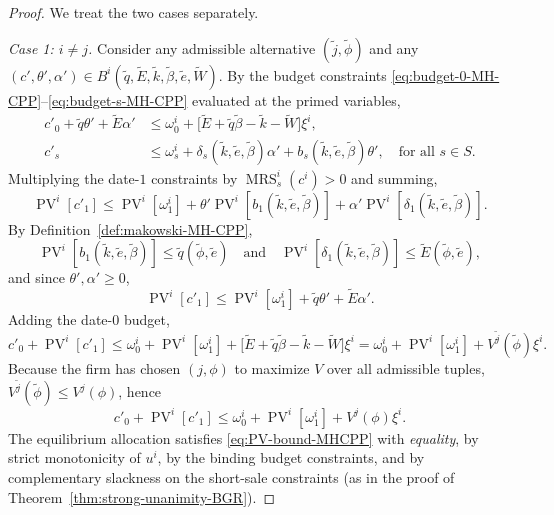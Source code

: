 \documentclass[11pt,a4paper,oneside]{book}
\def\leq{\leqslant}
\def\geq{\geqslant}
\def\et{\quad \text{and} \quad}
\DeclareMathOperator{\MRS}{MRS}
\DeclareMathOperator{\PV}{PV}
\theoremstyle{plain}
\theoremstyle{definition}
\theoremstyle{remark}
\numberwithin{equation}{chapter}
\begin{document}
\begin{proof}
We treat the two cases separately.

\emph{Case 1: $i \neq j$.}
Consider any admissible alternative $(\widetilde{j}, \widetilde{\phi})$ and any $(c', \theta', \alpha') \in B^i(\widetilde{q}, \widetilde{E}, \widetilde{k}, \widetilde{\beta}, \widetilde{e}, \widetilde{W})$.
By the budget constraints \eqref{eq:budget-0-MH-CPP}--\eqref{eq:budget-s-MH-CPP} evaluated at the primed variables,
\begin{align*}
  c'_0 + \widetilde{q} \theta' + \widetilde{E} \alpha'
  &\leq \omega^i_0 + \bigl[ \widetilde{E} + \widetilde{q} \widetilde{\beta} - \widetilde{k} - \widetilde{W} \bigr] \xi^i, \\
  c'_s
  &\leq \omega^i_s + \delta_s(\widetilde{k}, \widetilde{e}, \widetilde{\beta}) \alpha' + b_s(\widetilde{k}, \widetilde{e}, \widetilde{\beta}) \theta', \quad \text{for all $s\in S$}.
\end{align*}
Multiplying the date-$1$ constraints by $\MRS^i_s(c^i) > 0$ and summing,
\begin{equation*}
  \PV^i[c'_1]
  \leq \PV^i[\omega^i_1] + \theta' \PV^i[b_1(\widetilde{k}, \widetilde{e}, \widetilde{\beta})] + \alpha' \PV^i[\delta_1(\widetilde{k}, \widetilde{e}, \widetilde{\beta})].
\end{equation*}
By Definition~\ref{def:makowski-MH-CPP},
\begin{equation*}
  \PV^i[b_1(\widetilde{k}, \widetilde{e}, \widetilde{\beta})] \leq \widetilde{q}(\widetilde{\phi}, \widetilde{e})
  \et
  \PV^i[\delta_1(\widetilde{k}, \widetilde{e}, \widetilde{\beta})] \leq \widetilde{E}(\widetilde{\phi}, \widetilde{e}),
\end{equation*}
and since $\theta', \alpha' \geq 0$,
\begin{equation*}
  \PV^i[c'_1] \leq \PV^i[\omega^i_1] + \widetilde{q} \theta' + \widetilde{E} \alpha'.
\end{equation*}
Adding the date-$0$ budget,
\begin{equation*}
  c'_0 + \PV^i[c'_1]
  \leq \omega^i_0 + \PV^i[\omega^i_1] + \bigl[ \widetilde{E} + \widetilde{q} \widetilde{\beta} - \widetilde{k} - \widetilde{W} \bigr] \xi^i
  = \omega^i_0 + \PV^i[\omega^i_1] + V^{\widetilde{j}}(\widetilde{\phi}) \xi^i.
\end{equation*}
Because the firm has chosen $(j, \phi)$ to maximize $V$ over all admissible tuples, $V^{\widetilde{j}}(\widetilde{\phi}) \leq V^j(\phi)$, hence
\begin{equation}\label{eq:PV-bound-MHCPP}
  c'_0 + \PV^i[c'_1]
  \leq \omega^i_0 + \PV^i[\omega^i_1] + V^j(\phi) \xi^i.
\end{equation}
The equilibrium allocation satisfies \eqref{eq:PV-bound-MHCPP} with \emph{equality}, by strict monotonicity of $u^i$, by the binding budget constraints, and by complementary slackness on the short-sale constraints (as in the proof of Theorem~\ref{thm:strong-unanimity-BGR}).


\end{proof}
\end{document}
